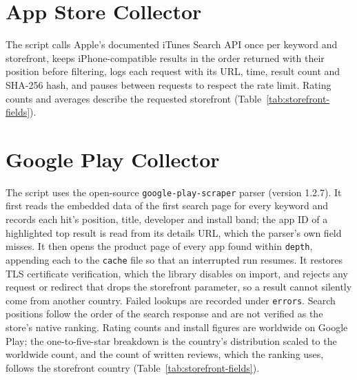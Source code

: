 \noindent
\begin{minipage}{\linewidth}

\end{minipage}
\par\medskip

\section{App Store Collector}
The script calls Apple's documented iTunes Search API once per keyword and
storefront, keeps iPhone-compatible results in the order returned with their
position before filtering, logs each request with its URL, time, result count and
SHA-256 hash, and pauses between requests to respect the rate limit. Rating counts
and averages describe the requested storefront (Table~\ref{tab:storefront-fields}).



\section{Google Play Collector}
The script uses the open-source \texttt{google-play-scraper} parser (version
1.2.7). It first reads the embedded data of the first search page for every
keyword and records each hit's position, title, developer and install band; the
app ID of a highlighted top result is read from its details URL, which the
parser's own field misses. It then opens the product page of every app found
within \texttt{depth}, appending each to the \texttt{cache} file so that an
interrupted run resumes. It restores TLS certificate verification, which the
library disables on import, and rejects any request or redirect that drops the
storefront parameter, so a result cannot silently come from another country.
Failed lookups are recorded under \texttt{errors}. Search positions follow the
order of the search response and are not verified as the store's native
ranking. Rating counts and install figures are worldwide on Google Play; the
one-to-five-star breakdown is the country's distribution scaled to the
worldwide count, and the count of written reviews, which the ranking uses,
follows the storefront country (Table~\ref{tab:storefront-fields}).


